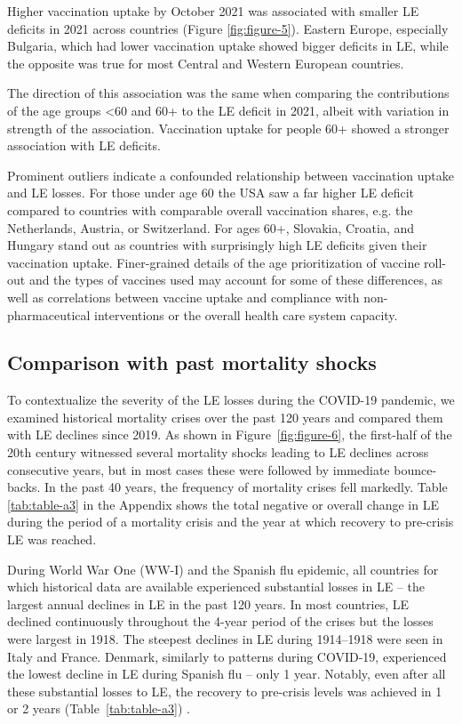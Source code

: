 \documentclass[12pt]{article}
\begin{document}
Higher vaccination uptake by October 2021 was associated with smaller LE deficits in 2021 across countries (Figure \ref{fig:figure-5}). Eastern Europe, especially Bulgaria, which had lower vaccination uptake showed bigger deficits in LE, while the opposite was true for most Central and Western European countries.

The direction of this association was the same when comparing the contributions of the age groups <60 and 60+ to the LE deficit in 2021, albeit with variation in strength of the association. Vaccination uptake for people 60+ showed a stronger association with LE deficits.

Prominent outliers indicate a confounded relationship between vaccination uptake and LE losses. For those under age 60 the USA saw a far higher LE deficit compared to countries with comparable overall vaccination shares, e.g. the Netherlands, Austria, or Switzerland. For ages 60+, Slovakia, Croatia, and Hungary stand out as countries with surprisingly high LE deficits given their vaccination uptake. Finer-grained details of the age prioritization of vaccine roll-out and the types of vaccines used may account for some of these differences, as well as correlations between vaccine uptake and compliance with non-pharmaceutical interventions or the overall health care system capacity.

\subsection*{Comparison with past mortality shocks}

To contextualize the severity of the LE losses during the COVID-19 pandemic, we examined historical mortality crises over the past 120 years and compared them with LE declines since 2019. As shown in Figure~\ref{fig:figure-6}, the first-half of the 20th century witnessed several mortality shocks leading to LE declines across consecutive years, but in most cases these were followed by immediate bounce-backs. In the past 40 years, the frequency of mortality crises fell markedly. Table \ref{tab:table-a3} in the Appendix shows the total negative or overall change in LE during the period of a mortality crisis and the year at which recovery to pre-crisis LE was reached.

During World War One (WW-I) and the Spanish flu epidemic, all countries for which historical data are available experienced substantial losses in LE -- the largest annual declines in LE in the past 120 years. In most countries, LE declined continuously throughout the 4-year period of the crises but the losses were largest in 1918. The steepest declines in LE during 1914--1918 were seen in Italy and France. Denmark, similarly to patterns during COVID-19, experienced the lowest decline in LE during Spanish flu -- only 1 year. Notably, even after all these substantial losses to LE, the recovery to pre-crisis levels was achieved in 1 or 2 years (Table~\ref{tab:table-a3}) .
\end{document}
